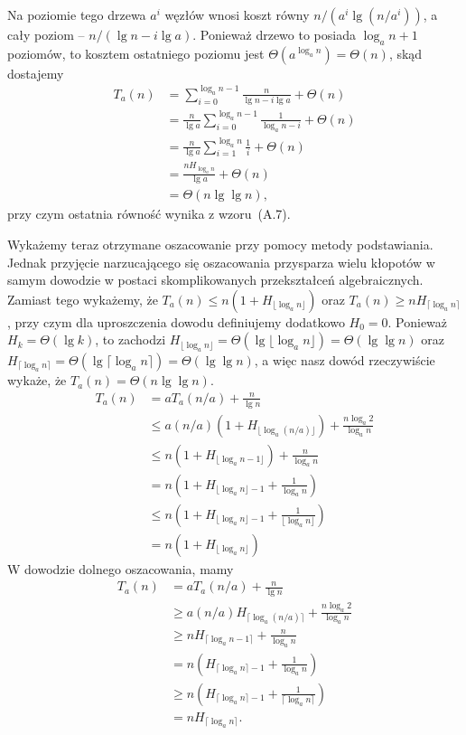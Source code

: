 Na  poziomie tego drzewa $a^i$ węzłów wnosi koszt równy $n/(a^i\lg(n/a^i))$, a cały poziom -- $n/(\lg n-i\lg a)$. Ponieważ drzewo to posiada $\log_an+1$ poziomów, to kosztem ostatniego poziomu jest $\Theta(a^{\log_an})=\Theta(n)$, skąd dostajemy
\begin{align*}
	T_a(n) &= \sum_{i=0}^{\log_an-1}\frac{n}{\lg n-i\lg a}+\Theta(n) \\
	&= \frac{n}{\lg a}\sum_{i=0}^{\log_an-1}\frac{1}{\log_an-i}+\Theta(n) \\
	&= \frac{n}{\lg a}\sum_{i=1}^{\log_an}\frac{1}{i}+\Theta(n) \\
	&= \frac{nH_{\log_an}}{\lg a}+\Theta(n) \\
	&= \Theta(n\lg\lg n),
\end{align*}
przy czym ostatnia równość wynika z wzoru~(A.7).

Wykażemy teraz otrzymane oszacowanie przy pomocy metody podstawiania. Jednak przyjęcie narzucającego się oszacowania przysparza wielu kłopotów w samym dowodzie w postaci skomplikowanych przekształceń algebraicznych. Zamiast tego wykażemy, że $T_a(n)\le n(1+H_{\lfloor\log_an\rfloor})$ oraz $T_a(n)\ge nH_{\lceil\log_an\rceil}$, przy czym dla uproszczenia dowodu definiujemy dodatkowo $H_0=0$. Ponieważ $H_k=\Theta(\lg k)$, to zachodzi $H_{\lfloor\log_an\rfloor}=\Theta(\lg\lfloor\log_an\rfloor)=\Theta(\lg\lg n)$ oraz $H_{\lceil\log_an\rceil}=\Theta(\lg\lceil\log_an\rceil)=\Theta(\lg\lg n)$, a więc nasz dowód rzeczywiście wykaże, że $T_a(n)=\Theta(n\lg\lg n)$.
\begin{align*}
	T_a(n) &= aT_a(n/a)+\frac{n}{\lg n} \\
	&\le a(n/a)(1+H_{\lfloor\log_a(n/a)\rfloor})+\frac{n\log_a2}{\log_an} \\
	&\le n(1+H_{\lfloor\log_an-1\rfloor})+\frac{n}{\log_an} \\
	&= n\left(1+H_{\lfloor\log_an\rfloor-1}+\frac{1}{\log_an}\right) \\
	&\le n\left(1+H_{\lfloor\log_an\rfloor-1}+\frac{1}{\lfloor\log_an\rfloor}\right) \\
	&= n(1+H_{\lfloor\log_an\rfloor})
\end{align*}
W dowodzie dolnego oszacowania, mamy
\begin{align*}
	T_a(n) &= aT_a(n/a)+\frac{n}{\lg n} \\
	&\ge a(n/a)H_{\lceil\log_a(n/a)\rceil}+\frac{n\log_a2}{\log_an} \\
	&\ge nH_{\lceil\log_an-1\rceil}+\frac{n}{\log_an} \\
	&= n\left(H_{\lceil\log_an\rceil-1}+\frac{1}{\log_an}\right) \\
	&\ge n\left(H_{\lceil\log_an\rceil-1}+\frac{1}{\lceil\log_an\rceil}\right) \\
	&= nH_{\lceil\log_an\rceil}.
\end{align*}

